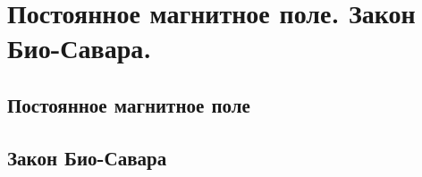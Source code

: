 \chapter{Постоянное магнитное поле. Закон Био-Савара.}

\section{Постоянное магнитное поле}
\section{Закон Био-Савара}
